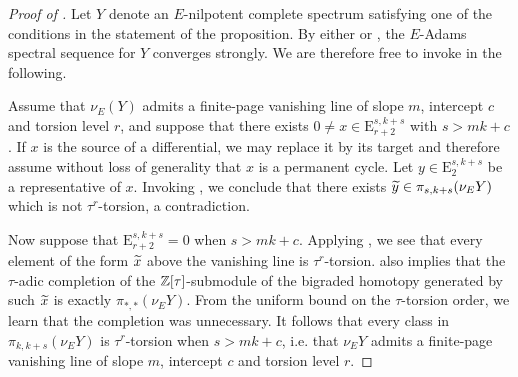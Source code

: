 \begin{proof}[Proof of ]
    Let $Y$ denote an $E$-nilpotent complete spectrum satisfying one of the conditions in the statement of the proposition. By either  or , the $E$-Adams spectral sequence for $Y$ converges strongly. We are therefore free to invoke  in the following.

    Assume that $\nu_E (Y)$ admits a finite-page vanishing line of slope $m$, intercept $c$ and torsion level $r$, and suppose that there exists $0 \neq x \in \mathrm{E}^{s,k+s} _{r+2}$ with $s > mk +c$. If $x$ is the source of a differential, we may replace it by its target and therefore assume without loss of generality that $x$ is a permanent cycle. Let $y \in \mathrm{E}^{s,k+s} _2$ be a representative of $x$. Invoking , we conclude that there exists $\wt{y} \in \pi_{s,k+s} (\nu_E Y)$ which is not $\tau^r$-torsion, a contradiction.

    Now suppose that $\mathrm{E}^{s,k+s} _{r+2} = 0$ when $s > mk+c$.  Applying , we see that every element of the form $\wt{x}$ above the vanishing line is $\tau^r$-torsion.  also implies that the $\tau$-adic completion of the $\mathbb{Z}[\tau]$-submodule of the bigraded homotopy generated by such $\wt{x}$ is exactly $\pi_{*,*} (\nu_E Y)$. From the uniform bound on the $\tau$-torsion order, we learn that the completion was unnecessary. It follows that every class in $\pi_{k,k+s} (\nu_E Y)$ is $\tau^r$-torsion when $s > mk + c$, i.e. that $\nu_E Y$ admits a finite-page vanishing line of slope $m$, intercept $c$ and torsion level $r$.
\end{proof}

